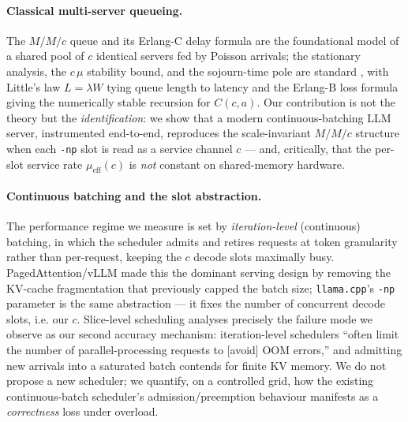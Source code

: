 \documentclass[11pt,a4paper]{article}
\begin{document}
\paragraph{Classical multi-server queueing.} The \(M/M/c\) queue and its
Erlang-C delay formula \citep{erlang1917} are the foundational model of a
shared pool of \(c\) identical servers fed by Poisson arrivals; the stationary
analysis, the \(c\,\mu\) stability bound, and the sojourn-time pole are standard
\citep{kleinrock1975,harchol2013}, with Little's law \(L=\lambda W\)
\citep{little1961} tying queue length to latency and the Erlang-B loss formula
\citep{erlangb1948} giving the numerically stable recursion for \(C(c,a)\). Our
contribution is not the theory but the \emph{identification}: we show that a
modern continuous-batching LLM server, instrumented end-to-end, reproduces the
scale-invariant \(M/M/c\) structure when each \texttt{-np} slot is read as a
service channel \(c\) --- and, critically, that the per-slot service rate
\(\mu_{\mathrm{eff}}(c)\) is \emph{not} constant on shared-memory hardware.

\paragraph{Continuous batching and the slot abstraction.} The performance
regime we measure is set by \emph{iteration-level} (continuous) batching, in
which the scheduler admits and retires requests at token granularity rather than
per-request, keeping the \(c\) decode slots maximally busy. PagedAttention/vLLM
\citep{kwon2023vllm} made this the dominant serving design by removing the
KV-cache fragmentation that previously capped the batch size; \texttt{llama.cpp}'s
\texttt{-np} parameter is the same abstraction --- it fixes the number of
concurrent decode slots, i.e. our \(c\). Slice-level scheduling
\citep{cheng2024scls} analyses precisely the failure mode we observe as our
second accuracy mechanism: iteration-level schedulers ``often limit the number
of parallel-processing requests to [avoid] OOM errors,'' and admitting new
arrivals into a saturated batch contends for finite KV memory. We do not propose
a new scheduler; we quantify, on a controlled grid, how the existing
continuous-batch scheduler's admission/preemption behaviour manifests as a
\emph{correctness} loss under overload.
\end{document}
